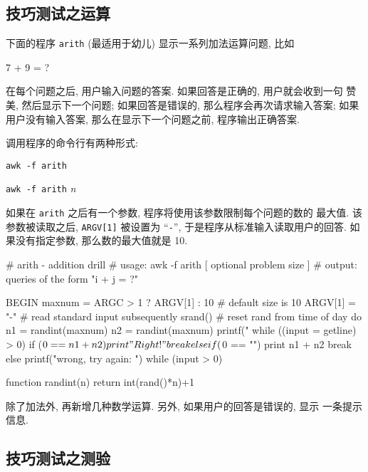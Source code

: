 \subsection{技巧测试之运算}
\label{subsec:skills_testing_arithmetic}

下面的程序 \texttt{arith} (最适用于幼儿) 显示一系列加法运算问题, 比如 
\begin{file}
    7 + 9 = ?
\end{file}
在每个问题之后, 用户输入问题的答案. 如果回答是正确的, 用户就会收到一句
赞美, 然后显示下一个问题; 如果回答是错误的, 那么程序会再次请求输入答案;
如果用户没有输入答案, 那么在显示下一个问题之前, 程序输出正确答案.

调用程序的命令行有两种形式:
\begin{pattern}
    \indent\indent\texttt{awk -f arith} \par 
    \indent\indent\texttt{awk -f arith} \textit{n}
\end{pattern}
如果在 \texttt{arith} 之后有一个参数, 程序将使用该参数限制每个问题的数的
最大值. 该参数被读取之后, \texttt{ARGV[1]} 被设置为 ``\texttt{-}'',
于是程序从标准输入读取用户的回答. 如果没有指定参数, 那么数的最大值就是
10.
\begin{awkcode}
    # arith - addition drill
    #   usage:  awk -f arith [ optional problem size ]
    #   output: queries of the form "i + j = ?"

    BEGIN {
        maxnum = ARGC > 1 ? ARGV[1] : 10   # default size is 10
        ARGV[1] = "-"  # read standard input subsequently
        srand()        # reset rand from time of day
        do {
            n1 = randint(maxnum)
            n2 = randint(maxnum)
            printf("%
            while ((input = getline) > 0)
                if ($0 == n1 + n2) {
                    print "Right!"
                    break
                } else if ($0 == "") {
                    print n1 + n2
                    break
                } else
                    printf("wrong, try again: ")
        } while (input > 0)
    }

    function randint(n) { return int(rand()*n)+1 }
\end{awkcode}

\begin{exercise}
    除了加法外, 再新增几种数学运算. 另外, 如果用户的回答是错误的, 显示 
    一条提示信息.
\end{exercise}

\subsection{技巧测试之测验}
\label{subsec:skills_testing_quiz}

